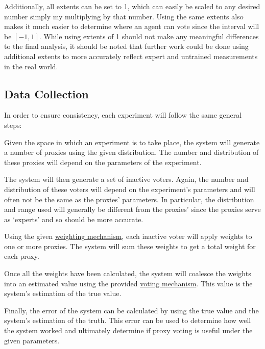 Additionally, all extents can be set to 1, which can easily be scaled to any
desired number simply my multiplying by that number.
Using the same extents also makes it much easier to determine where an agent
can vote since the interval will be $[-1, 1]$.
While using extents of 1 should not make any meaningful differences to the final
analysis, it should be noted that further work could be done using additional extents
to more accurately reflect expert and untrained measurements in the real world.

\subsection{Data Collection}\label{subsec:data-collection}
In order to ensure consistency, each experiment will follow the same general
steps:

\begin{enumerate}[label=\textbf{\arabic*}., leftmargin=2\parindent]
    Given the space in which an experiment is to take place, the system will
    generate a number of proxies using the given distribution.
    The number and distribution of these proxies will depend on the
    parameters of the experiment.

    The system will then generate a set of inactive voters.
    Again, the number and distribution of these voters will depend on the
    experiment's parameters and will often not be the same as the proxies'
    parameters.
    In particular, the distribution and range used will generally be
    different from the proxies' since the proxies serve as `experts' and so
    should be more accurate.

    Using the given \hyperref[subsec:weighting-mechanisms]{weighting mechanism},
    each inactive voter will apply weights to one or more proxies.
    The system will sum these weights to get a total weight for each proxy.

    Once all the weights have been calculated, the system will coalesce
    the weights into an estimated value using the provided
    \hyperref[subsec:voting-mechanisms]{voting mechanism}.
    This value is the system's estimation of the true value.

    Finally, the error of the system can be calculated by using the true
    value and the system's estimation of the truth.
    This error can be used to determine how well the system worked and
    ultimately determine if proxy voting is useful under the given parameters.
\end{enumerate}


